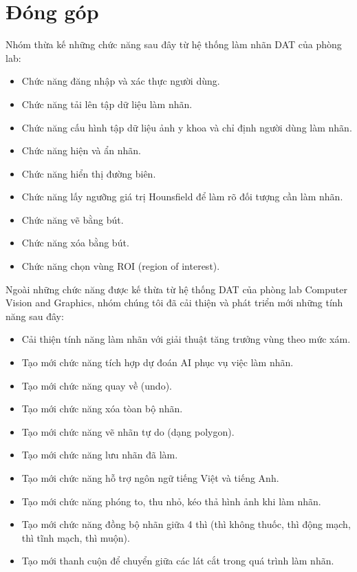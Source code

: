 \section{Đóng góp}
Nhóm thừa kế những chức năng sau đây từ hệ thống làm nhãn DAT của phòng lab: 
\begin{itemize}[noitemsep]
    \item Chức năng đăng nhập và xác thực người dùng.
    \item Chức năng tải lên tập dữ liệu làm nhãn.
	\item Chức năng cấu hình tập dữ liệu ảnh y khoa và chỉ định người dùng làm nhãn.
	\item Chức năng hiện và ẩn nhãn.
	\item Chức năng hiển thị đường biên.
	\item Chức năng lấy ngưỡng giá trị Hounsfield để làm rõ đối tượng cần làm nhãn.
	\item Chức năng vẽ bằng bút.
	\item Chức năng xóa bằng bút.
	\item Chức năng chọn vùng ROI (region of interest).
\end{itemize}

Ngoài những chức năng được kế thừa từ hệ thống DAT của phòng lab Computer Vision and Graphics, nhóm chúng tôi đã cải thiện và phát triển mới những tính năng sau đây:
\begin{itemize}[noitemsep]
    \item Cải thiện tính năng làm nhãn với giải thuật tăng trưởng vùng theo mức xám.
    \item Tạo mới chức năng tích hợp dự đoán AI phục vụ việc làm nhãn.
    \item Tạo mới chức năng quay về (undo).
    \item Tạo mới chức năng xóa tòan bộ nhãn.
    \item Tạo mới chức năng vẽ nhãn tự do (dạng polygon).
    \item Tạo mới chức năng lưu nhãn đã làm.
    \item Tạo mới chức năng hỗ trợ ngôn ngữ tiếng Việt và tiếng Anh.
    \item Tạo mới chức năng phóng to, thu nhỏ, kéo thả hình ảnh khi làm nhãn.
    \item Tạo mới chức năng đồng bộ nhãn giữa 4 thì (thì không thuốc, thì động mạch, thì tĩnh mạch, thì muộn).
    \item Tạo mới thanh cuộn để chuyển giữa các lát cắt trong quá trình làm nhãn.
\end{itemize}




